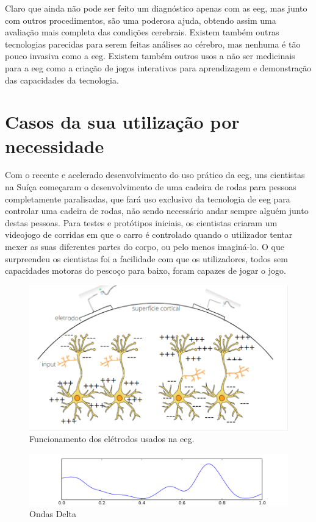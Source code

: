 \documentclass{report}
\begin{document}
Claro que ainda não pode ser feito um diagnóstico apenas com as \ac{eeg}, mas junto com outros procedimentos, são uma poderosa ajuda, obtendo assim uma avaliação mais completa das condições cerebrais. Existem também outras tecnologias parecidas para serem feitas análises ao cérebro, mas nenhuma é tão pouco invasiva como a \ac{eeg}.
Existem também outros usos a não ser medicinais para a \ac{eeg} como a criação de jogos interativos para aprendizagem e demonstração das capacidades da tecnologia. \cite{BrainSupport}

\section{Casos da sua utilização por necessidade}
Com o recente e acelerado desenvolvimento do uso prático da \ac{eeg}, uns cientistas na Suíça começaram o desenvolvimento de uma cadeira de rodas para pessoas completamente paralisadas, que fará uso exclusivo da tecnologia de \ac{eeg} para controlar uma cadeira de rodas, não sendo necessário andar sempre alguém junto destas pessoas. Para testes e protótipos iniciais, os cientistas criaram um videojogo de corridas em que o carro é controlado quando o utilizador tentar mexer as suas diferentes partes do corpo, ou pelo menos imaginá-lo. O que surpreendeu os cientistas foi a facilidade com que os utilizadores, todos sem capacidades motoras do pescoço para baixo, foram capazes de jogar o jogo. \cite{WralNews}



\newpage

\begin{figure}
    \centering
    \includegraphics[width=0.5\linewidth]{Figura_1_–_Neurônios_em_atividade_síncrona_e_orientada_até_o_eletrodo.png}
    \caption{Funcionamento dos elétrodos usados na \ac{eeg}.}
    \label{fig:2.1}
\end{figure}

\begin{figure}
    \centering
    \includegraphics[width=0.7\linewidth]{Eeg_delta.svg.png}
    \caption{Ondas Delta}
    \label{fig:2.2}
\end{figure}
\end{document}
